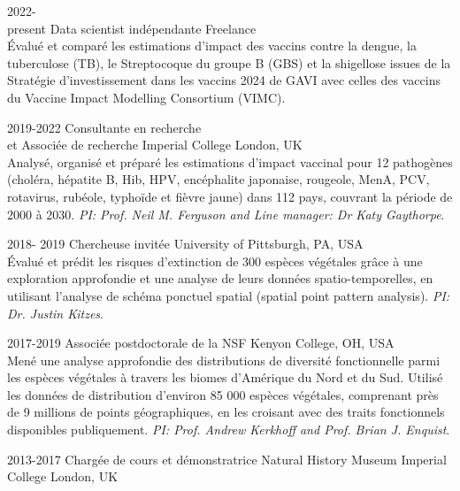 \documentclass[icon]{twentysecondcv}
\begin{document}
\begin{twenty} %


 \twentyitem
    	{2022- \\ present}
    	{Data scientist indépendante}
	{Freelance}
        	{\\ \small Évalué et comparé les estimations d’impact des vaccins contre la dengue, la tuberculose (TB), le Streptocoque du groupe B (GBS) et la shigellose issues de la Stratégie d’investissement dans les vaccins 2024 de GAVI avec celles des vaccins du Vaccine Impact Modelling Consortium (VIMC).}
        	
	
 \twentyitem
       {2019-2022}
       {Consultante en recherche \\ et Associée de recherche}
       {Imperial College London, UK}
       {\\ \small Analysé, organisé et préparé les estimations d’impact vaccinal pour 12 pathogènes (choléra, hépatite B, Hib, HPV, encéphalite japonaise, rougeole, MenA, PCV, rotavirus, rubéole, typhoïde et fièvre jaune) dans 112 pays, couvrant la période de 2000 à 2030. \textit{ PI: Prof. Neil M. Ferguson and Line manager: Dr Katy Gaythorpe}.}
      
\twentyitem
    	{2018- 2019}
	{Chercheuse invitée}
        	{University of Pittsburgh, PA, USA}
        	{\\ \small Évalué et prédit les risques d’extinction de 300 espèces végétales grâce à une exploration approfondie et une analyse de leurs données spatio-temporelles, en utilisant l’analyse de schéma ponctuel spatial (spatial point pattern analysis).  \textit{PI: Dr. Justin Kitzes}.}

	\twentyitem
    	{2017-2019}
	{Associée postdoctorale de la NSF}
        {Kenyon College, OH, USA}
        {\\ \small Mené une analyse approfondie des distributions de diversité fonctionnelle parmi les espèces végétales à travers les biomes d’Amérique du Nord et du Sud. Utilisé les données de distribution d’environ 85 000 espèces végétales, comprenant près de 9 millions de points géographiques, en les croisant avec des traits fonctionnels disponibles publiquement. \textit{PI: Prof. Andrew Kerkhoff and Prof. Brian J. Enquist}. }
      
    
    \twentyitem
	{2013-2017}
	{Chargée de cours et démonstratrice}
	{Natural History Museum  Imperial College London, UK}
	{}
\end{twenty}
\end{document}
